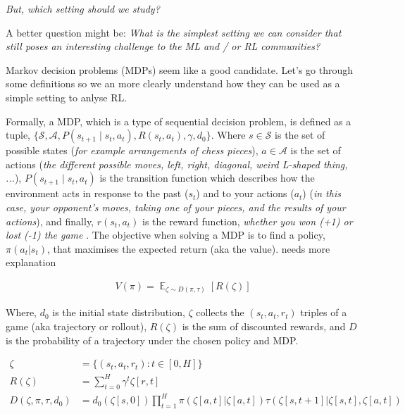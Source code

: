\begin{displayquote}
  \textit{But, which setting should we study?}
\end{displayquote}

\begin{displayquote}
  A better question might be: \textit{What is the simplest setting we can
  consider that still poses an interesting challenge to the ML and / or RL communities?}
\end{displayquote}

Markov decision problems (MDPs) seem like a good candidate. Let's go through some definitions so we an more clearly understand how they can be used as a
simple setting to anlyse RL.

Formally, a MDP, which is a type of sequential decision problem, is defined
as a tuple, $\{\mathcal S, \mathcal A, P(s_{t+1} \mid s_t, a_t),R(s_t, a_t), \gamma, d_0\}$.
Where \(s \in \mathcal S\) is the set of possible states (\textit{for example arrangements of chess pieces}),
\(a \in \mathcal A\) is the set of actions (\textit{the different possible moves, left,
right, diagonal, weird L-shaped thing, ...}),  \(P(s_{t+1} \mid s_t, a_t)\)
is the transition function which describes how the environment acts in response
to the past (\(s_t\)) and to your actions (\(a_t\)) (\textit{in this case, your
opponent's moves, taking one of your pieces, and the results of your actions}),
and finally, \(r(s_t, a_t)\) is the reward function, \textit{whether you won (+1) or lost (-1) the game }.
The objective when solving a MDP is to find a policy, $\pi(a_t | s_t)$,
that maximises the expected return (aka the value). {\color{red}needs more explanation}

\begin{align*}
V(\pi) = \mathop{\mathbb E}_{\zeta \sim D(\pi, \tau)} [R(\zeta)]
\end{align*}


Where, $d_0$ is the initial state distribution, $\zeta$ collects the $(s_t, a_t, r_t)$ triples of a game (aka trajectory or rollout),
$R(\zeta)$ is the sum of discounted rewards, and $D$ is the probability of a trajectory under the chosen policy and MDP.

\begin{align}
\zeta &= \{(s_t, a_t, r_t) : t \in [0, H]\} \tag{trajectory} \\
R(\zeta) &=\sum_{t=0}^H \gamma^t \zeta[r, t] \tag{Return} \\
D(\zeta, \pi, \tau, d_0) &= d_0(\zeta[s, 0]) \prod_{t=1}^{H} \pi(\zeta[a, t]|\zeta[a, t]) \tau(\zeta[s, t+1]|\zeta[s, t], \zeta[a, t]) \tag{p(traj)}
\end{align}

